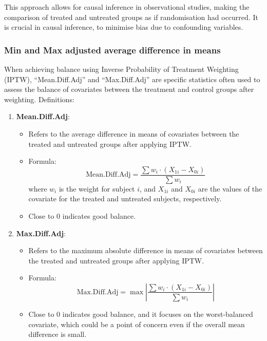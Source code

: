 \documentclass[
  singlecolumn]{article}
\providecommand{\tightlist}{%
  \setlength{\itemsep}{0pt}\setlength{\parskip}{0pt}}\usepackage{longtable,booktabs,array}
\begin{document}
This approach allows for causal inference in observational studies,
making the comparison of treated and untreated groups as if
randomisation had occurred. It is crucial in causal inference, to
minimise bias due to confounding variables.

\subsubsection{Min and Max adjusted average difference in
means}\label{min-and-max-adjusted-average-difference-in-means}

When achieving balance using Inverse Probability of Treatment Weighting
(IPTW), ``Mean.Diff.Adj'' and ``Max.Diff.Adj'' are specific statistics
often used to assess the balance of covariates between the treatment and
control groups after weighting. Definitions:

\begin{enumerate}
\def\labelenumi{\arabic{enumi}.}
\tightlist
\item
  \textbf{Mean.Diff.Adj}:

  \begin{itemize}
  \tightlist
  \item
    Refers to the average difference in means of covariates between the
    treated and untreated groups after applying IPTW.
  \item
    Formula: \[
    \text{Mean.Diff.Adj} = \frac{{\sum w_i \cdot (X_{1i} - X_{0i})}}{{\sum w_i}}
    \] where \(w_i\) is the weight for subject \(i\), and \(X_{1i}\) and
    \(X_{0i}\) are the values of the covariate for the treated and
    untreated subjects, respectively.
  \item
    Close to 0 indicates good balance.
  \end{itemize}
\item
  \textbf{Max.Diff.Adj}:

  \begin{itemize}
  \tightlist
  \item
    Refers to the maximum absolute difference in means of covariates
    between the treated and untreated groups after applying IPTW.
  \item
    Formula: \[
    \text{Max.Diff.Adj} = \max \left| \frac{{\sum w_i \cdot (X_{1i} - X_{0i})}}{{\sum w_i}} \right|
    \]
  \item
    Close to 0 indicates good balance, and it focuses on the
    worst-balanced covariate, which could be a point of concern even if
    the overall mean difference is small.
  \end{itemize}
\end{enumerate}
\end{document}
